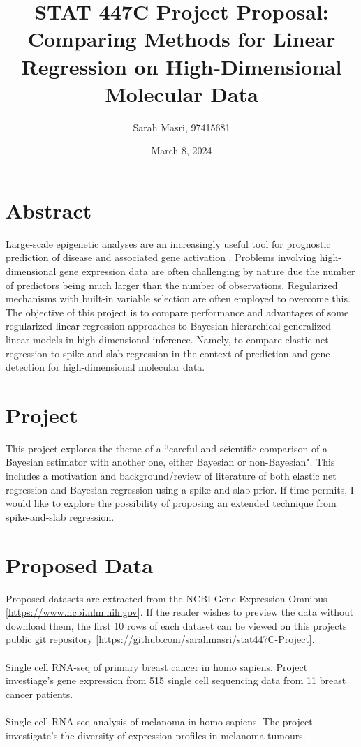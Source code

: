 \documentclass[12pt]{extarticle}
\title{\myfont STAT 447C Project Proposal: Comparing Methods for Linear Regression on High-Dimensional Molecular Data}
\author{Sarah Masri, 97415681}
\date{March 8, 2024}
\begin{document}
\maketitle

\section{Abstract}

\noindent Large-scale epigenetic analyses are an increasingly useful tool for prognostic prediction of disease and associated gene activation \cite{Tang2017}. Problems involving high-dimensional gene expression data are often challenging by nature due the number of predictors being much larger than the number of observations. Regularized mechanisms with built-in variable selection are often employed to overcome this. The objective of this project is to compare performance and advantages of some regularized linear regression approaches to Bayesian hierarchical generalized linear models in high-dimensional inference. Namely, to compare elastic net regression to spike-and-slab regression in the context of prediction and gene detection for high-dimensional molecular data. 

\section{Project}

\noindent This project explores the theme of a ``careful and scientific comparison of a Bayesian estimator with another one, either Bayesian or non-Bayesian". This includes a motivation and background/review of literature of both elastic net regression and Bayesian regression using a spike-and-slab prior. If time permits, I would like to explore the possibility of proposing an extended technique from spike-and-slab regression.  

\section{Proposed Data}
\noindent Proposed datasets are extracted from the NCBI Gene Expression Omnibus [\url{https://www.ncbi.nlm.nih.gov}]. If the reader wishes to preview the data without download them, the first 10 rows of each dataset can be viewed on this projects public git repository [\url{https://github.com/sarahmasri/stat447C-Project}]. 
\\
\\
  Single cell RNA-seq of primary breast cancer in homo sapiens. Project investiage's gene expression from 515 single cell sequencing data from 11 breast cancer patients.
\newline [\url{https://www.ncbi.nlm.nih.gov/geo/query/acc.cgi?acc=GSE75688}]
\\
\\
 	Single cell RNA-seq analysis of melanoma in homo sapiens. The project investigate's the diversity of expression profiles in melanoma tumours.
\newline  [\url{https://www.ncbi.nlm.nih.gov/geo/query/acc.cgi?acc=GSE72056}]
\end{document}
